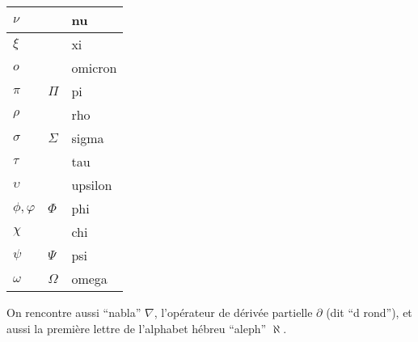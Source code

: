 \documentclass[10pt,class=article,crop=false]{standalone}
\begin{document}
\begin{multicols}{2}
\begin{center}	
	\begin{tabular}[t]{|ll|l@{\vrule depth 1.2ex height 3ex width 0mm \ }|}
		\hline
		$\nu$         &               & nu      \\ \hline
		$\xi$         &               & xi      \\ \hline
		$o$           &               & omicron \\ \hline
		$\pi$         & $\Pi$         & pi      \\ \hline
		$\rho$        &               & rho     \\ \hline
		$\sigma$      & $\Sigma$      & sigma   \\ \hline
		$\tau$        &               & tau     \\ \hline
		$\upsilon$    &               & upsilon \\ \hline
		$\phi,\varphi$& $\Phi$        & phi     \\ \hline
		$\chi$        &               & chi     \\ \hline
		$\psi$        & $\Psi$        & psi     \\ \hline
		$\omega$      & $\Omega$      & omega   \\ \hline
	\end{tabular}
\end{center}



\end{multicols}


On rencontre aussi ``nabla'' $\nabla$, l'opérateur de dérivée
partielle $\partial$ (dit ``d rond''), et aussi la première
lettre de l'alphabet hébreu ``aleph'' $\aleph$.
\end{document}
